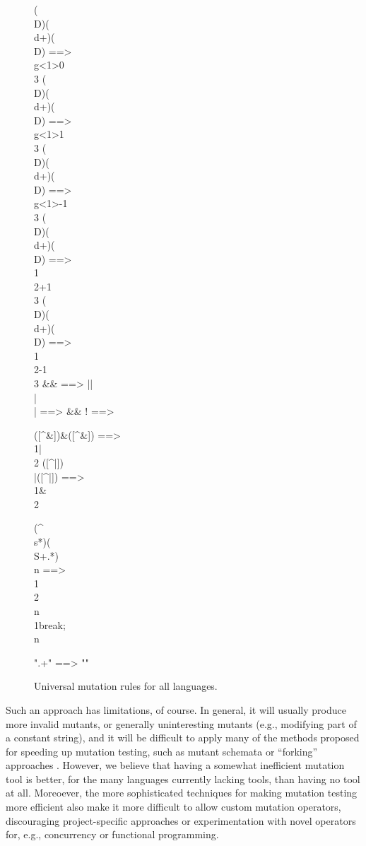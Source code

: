 \begin{figure}
{\begin{code}
(\\D)(\\d+)(\\D) ==> \\g<1>0\\3
(\\D)(\\d+)(\\D) ==> \\g<1>1\\3
(\\D)(\\d+)(\\D) ==> \\g<1>-1\\3
(\\D)(\\d+)(\\D) ==> \\1\\2+1\\3
(\\D)(\\d+)(\\D) ==> \\1\\2-1\\3
\&\& ==> ||
\\|\\| ==> \&\&
! ==>

([^\&])\&([^\&]) ==> \\1|\\2
([^|])\\|([^|]) ==> \\1\&\\2

(^\\s*)(\\S+.*)\\n ==> \\1\\2\\n\\1break;\\n

".+" ==> ""
\end{code}
}
\caption{Universal mutation rules for all languages.}
\label{fig:universal}
\end{figure}

Such an approach has limitations, of course.  In general, it will
usually produce more invalid mutants, or generally uninteresting mutants (e.g.,
modifying part of a constant string), and it will be difficult to
apply many of the methods proposed for speeding up mutation testing,
such as mutant schemata \cite{untch1993mutation} or ``forking''
approaches \cite{Equiv,TopsyTurvy}.  However, we believe that having a
somewhat inefficient mutation tool is better, for the many languages
currently lacking tools, than having no tool at all.  Moreoever, the
more sophisticated techniques for making mutation testing more
efficient also make it more difficult to allow custom mutation
operators, discouraging project-specific approaches or experimentation
with novel operators for, e.g., concurrency or functional programming.

